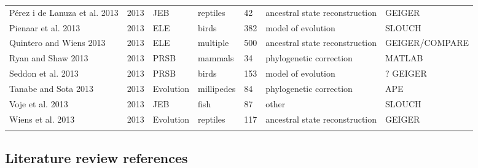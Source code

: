\begin{landscape}
\begin{center}
\begin{longtable}{p{6cm}llllll}
P\'{e}rez i de Lanuza et al. 2013 &   2013    &   JEB &   reptiles    &   42  &   ancestral state reconstruction  &   GEIGER  \\
Pienaar et al. 2013   &   2013    &   ELE &   birds   &   382 &   model of evolution  &   SLOUCH  \\
Quintero and Wiens 2013   &   2013    &   ELE &   multiple    &   500 &   ancestral state reconstruction  &   GEIGER/COMPARE  \\
Ryan and Shaw 2013    &   2013    &   PRSB    &   mammals &   34  &   phylogenetic correction &   MATLAB  \\
Seddon et al. 2013    &   2013    &   PRSB    &   birds   &   153 &   model of evolution  &   ? GEIGER  \\
Tanabe and Sota 2013  &   2013    &   Evolution   &   millipedes  &   84  &   phylogenetic correction &   APE \\
Voje et al. 2013  &   2013    &   JEB &   fish    &   87  &   other   &   SLOUCH  \\
Wiens et al. 2013 &   2013    &   Evolution   &   reptiles    &   117 &   ancestral state reconstruction  &   GEIGER  \\
\hline
\label{table:litreview}
\end{longtable}
\end{center}
\end{landscape}
   
\subsection{Literature review references}

